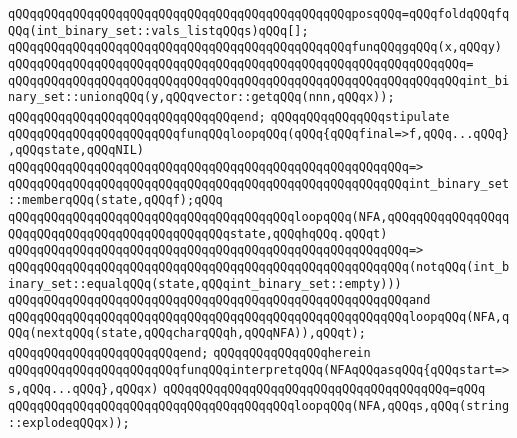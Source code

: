 \newline
\verb|qQQqqQQqqQQqqQQqqQQqqQQqqQQqqQQqqQQqqQQqqQQqqQQqposqQQq=qQQqfoldqQQqfqQQq(int_binary_set::vals_listqQQqs)qQQq[];|\newline
\newline
\verb|qQQqqQQqqQQqqQQqqQQqqQQqqQQqqQQqqQQqqQQqqQQqqQQqfunqQQqgqQQq(x,qQQqy)|\newline
\verb|qQQqqQQqqQQqqQQqqQQqqQQqqQQqqQQqqQQqqQQqqQQqqQQqqQQqqQQqqQQqqQQq=|\newline
\verb|qQQqqQQqqQQqqQQqqQQqqQQqqQQqqQQqqQQqqQQqqQQqqQQqqQQqqQQqqQQqqQQqint_binary_set::unionqQQq(y,qQQqvector::getqQQq(nnn,qQQqx));|\newline
\verb|qQQqqQQqqQQqqQQqqQQqqQQqqQQqqQQqend;|\newline
\newline
\verb|qQQqqQQqqQQqqQQqstipulate|\newline
\verb|qQQqqQQqqQQqqQQqqQQqqQQqfunqQQqloopqQQq(qQQq{qQQqfinal=>f,qQQq...qQQq},qQQqstate,qQQqNIL)|\newline
\verb|qQQqqQQqqQQqqQQqqQQqqQQqqQQqqQQqqQQqqQQqqQQqqQQqqQQqqQQq=>|\newline
\verb|qQQqqQQqqQQqqQQqqQQqqQQqqQQqqQQqqQQqqQQqqQQqqQQqqQQqqQQqint_binary_set::memberqQQq(state,qQQqf);qQQq|\newline
\newline
\verb|qQQqqQQqqQQqqQQqqQQqqQQqqQQqqQQqqQQqqQQqloopqQQq(NFA,qQQqqQQqqQQqqQQqqQQqqQQqqQQqqQQqqQQqqQQqqQQqqQQqstate,qQQqhqQQq.qQQqt)|\newline
\verb|qQQqqQQqqQQqqQQqqQQqqQQqqQQqqQQqqQQqqQQqqQQqqQQqqQQqqQQq=>|\newline
\verb|qQQqqQQqqQQqqQQqqQQqqQQqqQQqqQQqqQQqqQQqqQQqqQQqqQQqqQQq(notqQQq(int_binary_set::equalqQQq(state,qQQqint_binary_set::empty)))|\newline
\verb|qQQqqQQqqQQqqQQqqQQqqQQqqQQqqQQqqQQqqQQqqQQqqQQqqQQqqQQqand|\newline
\verb|qQQqqQQqqQQqqQQqqQQqqQQqqQQqqQQqqQQqqQQqqQQqqQQqqQQqqQQqloopqQQq(NFA,qQQq(nextqQQq(state,qQQqcharqQQqh,qQQqNFA)),qQQqt);|\newline
\verb|qQQqqQQqqQQqqQQqqQQqqQQqend;|\newline
\verb|qQQqqQQqqQQqqQQqherein|\newline
\verb|qQQqqQQqqQQqqQQqqQQqqQQqfunqQQqinterpretqQQq(NFAqQQqasqQQq{qQQqstart=>s,qQQq...qQQq},qQQqx)|\newline
\verb|qQQqqQQqqQQqqQQqqQQqqQQqqQQqqQQqqQQqqQQq=qQQq|\newline
\verb|qQQqqQQqqQQqqQQqqQQqqQQqqQQqqQQqqQQqqQQqloopqQQq(NFA,qQQqs,qQQq(string::explodeqQQqx));|\newline
